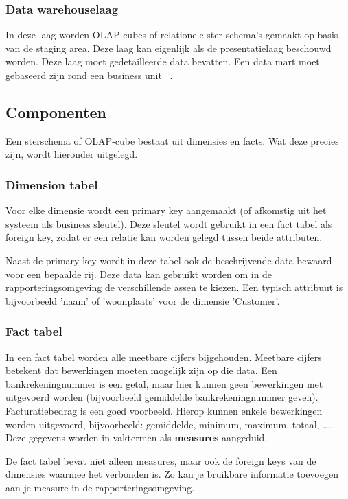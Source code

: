 \pagebreak

\subsubsection{Data warehouselaag}
In deze laag worden OLAP-cubes of relationele ster schema's gemaakt op basis van de staging area. Deze laag kan eigenlijk als de presentatielaag beschouwd worden. Deze laag moet gedetailleerde data bevatten. Een data mart moet gebaseerd zijn rond een business unit ~\autocite{Kimball2013}.

\subsection{Componenten}
Een sterschema of OLAP-cube bestaat uit dimensies en facts. Wat deze precies zijn, wordt hieronder uitgelegd. 

\subsubsection{Dimension tabel}
Voor elke dimensie wordt een primary key aangemaakt (of afkomstig uit het systeem als business sleutel). Deze sleutel wordt gebruikt in een fact tabel als foreign key, zodat er een relatie kan worden gelegd tussen beide attributen.

Naast de primary key wordt in deze tabel ook de beschrijvende data bewaard voor een bepaalde rij. Deze data kan gebruikt worden om in de rapporteringsomgeving de verschillende assen te kiezen. Een typisch attribuut is bijvoorbeeld 'naam' of 'woonplaats' voor de dimensie 'Customer'.

\subsubsection{Fact tabel}
In een fact tabel worden alle meetbare cijfers bijgehouden. Meetbare cijfers betekent dat bewerkingen moeten mogelijk zijn op die data. Een bankrekeningnummer is een getal, maar hier kunnen geen bewerkingen met uitgevoerd worden (bijvoorbeeld gemiddelde bankrekeningnummer geven). Facturatiebedrag is een goed voorbeeld. Hierop kunnen enkele bewerkingen worden uitgevoerd, bijvoorbeeld: gemiddelde, minimum, maximum, totaal, .... Deze gegevens worden in vaktermen als \textbf{measures} aangeduid. 

De fact tabel bevat niet alleen measures, maar ook de foreign keys van de dimensies waarmee het verbonden is. Zo kan je bruikbare informatie toevoegen aan je measure in de rapporteringsomgeving.

